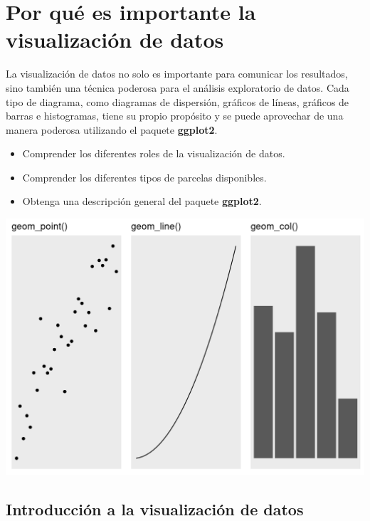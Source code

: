 \documentclass[
]{book}
\providecommand{\tightlist}{%
  \setlength{\itemsep}{0pt}\setlength{\parskip}{0pt}}
\begin{document}
\hypertarget{por-quuxe9-es-importante-la-visualizaciuxf3n-de-datos}{%
\section{Por qué es importante la visualización de datos}\label{por-quuxe9-es-importante-la-visualizaciuxf3n-de-datos}}

La visualización de datos no solo es importante para comunicar los resultados, sino también una técnica poderosa para el análisis exploratorio de datos. Cada tipo de diagrama, como diagramas de dispersión, gráficos de líneas, gráficos de barras e histogramas, tiene su propio propósito y se puede aprovechar de una manera poderosa utilizando el paquete \textbf{ggplot2}.

\begin{itemize}
\tightlist
\item
  Comprender los diferentes roles de la visualización de datos.
\item
  Comprender los diferentes tipos de parcelas disponibles.
\item
  Obtenga una descripción general del paquete \textbf{ggplot2}.
\end{itemize}

\includegraphics{img/geom.png}

\hypertarget{introducciuxf3n-a-la-visualizaciuxf3n-de-datos}{%
\subsection{Introducción a la visualización de datos}\label{introducciuxf3n-a-la-visualizaciuxf3n-de-datos}}
\end{document}
